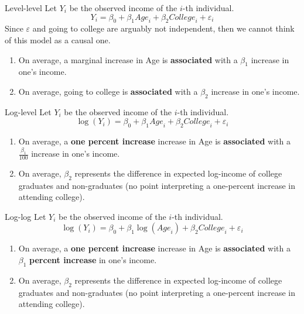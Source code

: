 \documentclass{clbeamer2024}
\begin{document}
\begin{frame}{Level-level}
    Let $Y_i$ be the observed income of the $i$-th individual.
    \begin{equation*}
        Y_i = \beta_0 + \beta_1 \textit{Age}_i + \beta_2 \textit{College}_i + \varepsilon_i
    \end{equation*}
    Since $\varepsilon$ and going to college are arguably not independent, then we cannot think of this model as a causal one.

    \pause
    \begin{enumerate}
        \item On average, a marginal increase in Age is \textbf{associated} with a $\beta_1$ increase in one's income.
        \item On average, going to college is \textbf{associated} with a $\beta_2$ increase in one's income.
    \end{enumerate}
\end{frame}

\begin{frame}{Log-level}
    Let $Y_i$ be the observed income of the $i$-th individual.
    \begin{equation*}
        \log(Y_i) = \beta_0 + \beta_1 \textit{Age}_i + \beta_2 \textit{College}_i + \varepsilon_i
    \end{equation*}

    \pause
    \begin{enumerate}
        \item On average, a \textbf{one percent increase} increase in Age is \textbf{associated} with a $\frac{\beta_1}{100}$ increase in one's income.
        \item On average, $\beta_2$ represents the difference in expected log-income of college graduates and non-graduates (no point interpreting a one-percent increase in attending college).
    \end{enumerate}
\end{frame}

\begin{frame}{Log-log}
    Let $Y_i$ be the observed income of the $i$-th individual.
    \begin{equation*}
        \log(Y_i) = \beta_0 + \beta_1 \log(\textit{Age}_i) + \beta_2 \textit{College}_i + \varepsilon_i
    \end{equation*}

    \pause
    \begin{enumerate}
        \item On average, a \textbf{one percent increase} increase in Age is \textbf{associated} with a $\beta_1$ \textbf{percent increase} in one's income.
        \item On average, $\beta_2$ represents the difference in expected log-income of college graduates and non-graduates (no point interpreting a one-percent increase in attending college).
    \end{enumerate}
\end{frame}
\end{document}
